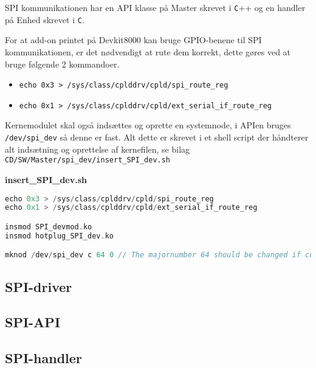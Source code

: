 


SPI kommunikationen har en API klasse på Master skrevet i \verb+C+++ og en handler på Enhed skrevet i \verb+C+.

For at add-on printet på Devkit8000 kan bruge GPIO-benene til SPI kommunikationen, er
det nødvendigt at rute dem korrekt, dette gøres ved at bruge følgende 2 kommandoer.


\begin{itemize}
\item \verb+echo 0x3 > /sys/class/cplddrv/cpld/spi_route_reg+
\item \verb+echo 0x1 > /sys/class/cplddrv/cpld/ext_serial_if_route_reg+
\end{itemize}

Kernemodulet skal også indsættes og oprette en systemnode, i APIen bruges \verb+/dev/spi_dev+ så denne er fast.
Alt dette er skrevet i et shell script der håndterer alt indsætning og oprettelse af kernefilen, se bilag \verb+CD/SW/Master/spi_dev/insert_SPI_dev.sh+

\textbf{insert\_SPI\_dev.sh}

\begin{lstlisting}[language=C]
echo 0x3 > /sys/class/cplddrv/cpld/spi_route_reg
echo 0x1 > /sys/class/cplddrv/cpld/ext_serial_if_route_reg

insmod SPI_devmod.ko
insmod hotplug_SPI_dev.ko

mknod /dev/spi_dev c 64 0 // The majornumber 64 should be changed if conflict occur
\end{lstlisting}


\subsection{SPI-driver}



\subsection{SPI-API}




\subsection{SPI-handler}



